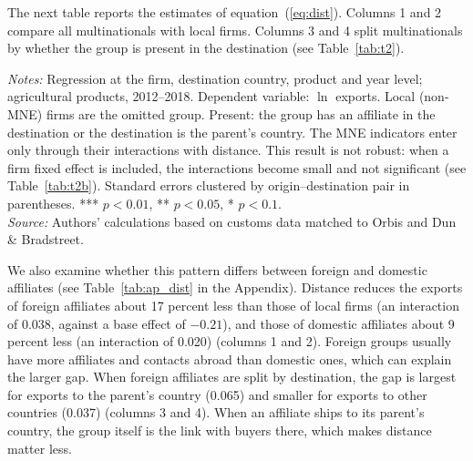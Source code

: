 \documentclass[11pt,a4paper]{article}
\newcommand{\srcnote}{\textit{Source:} Authors' calculations based on customs data matched to Orbis and Dun \& Bradstreet.}
\begin{document}
The next table reports the estimates of equation~(\ref{eq:dist}). Columns 1 and 2 compare all
multinationals with local firms. Columns 3 and 4 split multinationals by whether the group is
present in the destination (see Table~\ref{tab:t2}).
\begin{table}[H]\centering\small%
  \caption{Distance and Firm Agricultural Exports: Multinationals by Presence at the Destination}%
  \label{tab:t2}%
  \par\vspace{3pt}%
  \begin{minipage}{0.95\textwidth}\footnotesize %
  \textit{Notes:} Regression at the firm, destination country, product and year level; agricultural products, 2012--2018. Dependent variable: $\ln$ exports. Local (non-MNE) firms are the omitted group. Present: the group has an affiliate in the destination or the destination is the parent's country. The MNE indicators enter only through their interactions with distance. This result is not robust: when a firm fixed effect is included, the interactions become small and not significant (see Table~\ref{tab:t2b}). Standard errors clustered by origin--destination pair in parentheses. *** $p<0.01$, ** $p<0.05$, * $p<0.1$.\\[3pt]%
  \srcnote%
  \end{minipage}%
  \end{table}

We also examine whether this pattern differs between foreign and domestic affiliates (see
Table~\ref{tab:ap_dist} in the Appendix). Distance reduces the exports of foreign affiliates about 17 percent less than those
of local firms (an interaction of 0.038, against a base effect of $-0.21$), and those of domestic
affiliates about 9 percent less (an interaction of 0.020) (columns 1 and 2). Foreign groups
usually have more affiliates and contacts abroad than domestic ones, which can explain the larger
gap. When foreign affiliates are split by destination, the gap is largest for exports to the
parent's country (0.065) and smaller for exports to other countries (0.037) (columns 3 and 4). When
an affiliate ships to its parent's country, the group itself is the link with buyers there, which
makes distance matter less.
\end{document}
